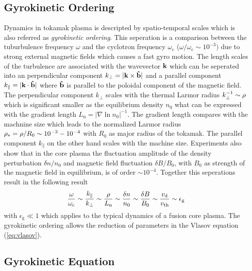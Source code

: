\newpage

\subsection{Gyrokinetic Ordering}
\label{sub:gyroordering}

Dynamics in tokamak plasma is descripted by spatio-temporal scales which is also referred as \textit{gyrokinetic ordering}. This seperation is a comparison between the tuburbulence frequency $\omega$ and the cyclotron frequency $\omega_\mathrm{c}$ ($\omega/\omega_\mathrm{c} \sim 10^{-3})$ due to strong external magnetic fields which causes a fast gyro motion. The length scales of the turbulence are associated with the wavevector $\boldsymbol{\mathbf{k}}$ which can be seperated into an perpendicular component $k_\perp = |\boldsymbol{\mathbf{k}} \times \boldsymbol{\mathbf{\hat{b}}}|$ and a parallel component $k_\parallel = |\boldsymbol{\mathbf{k}} \cdot \boldsymbol{\mathbf{\hat{b}}}|$ where $\boldsymbol{\mathbf{\hat{b}}}$ is parallel to the poloidal component of the magnetic field. The perpendicular component $k_\perp$ scales with the thermal Larmor radius $k_\perp^{-1} \sim \rho$ which is significant smaller as the equilibrium density $n_0$ what can be expressed with the gradient length $L_\mathrm{n} = |\nabla \ln n_0 |^{-1}$. The gradient length compares with the machnine size which leads to the normalized Larmor radius $\rho_* = \rho/R_0 \sim 10^{-3} - 10^{-4}$ with $R_0$ as major radius of the tokamak. The parallel component $k_\parallel$ on the other hand scales with the machine size. Experiments also show that in the core plasma the fluctuation amplitude of the density perturbation $\delta n/n_0$ and magnetic field fluctuation $\delta B/B_0$, with $B_0$ as strength of the magnetic field in equilibrium, is of order $\sim 10^{-4}$. Together this seperations result in the following result
\begin{gather}
	\frac{\omega}{\omega_\mathrm{c}} \sim \frac{k_\parallel}{k_\perp} \sim \frac{\rho}{L_\mathrm{n}} \sim \frac{\delta n}{n_0} \sim \frac{\delta B}{B_0} \sim \frac{v_\mathrm{d}}{v_{\mathrm{th}}} \sim \epsilon_\mathrm{g}
	\label{eq:gyroordering}
\end{gather}
with $\epsilon_\mathrm{g} \ll 1$ which applies to the typical dynamics of a fusion core plasma. \cite{Brizard2007,Garbet2010} The gyrokinetic ordering allows the reduction of parameters in the Vlasov equation (\ref{eq:vlasov}).

\newpage

\subsection{Gyrokinetic Equation}
\label{sub:gyrokinetic}
 
